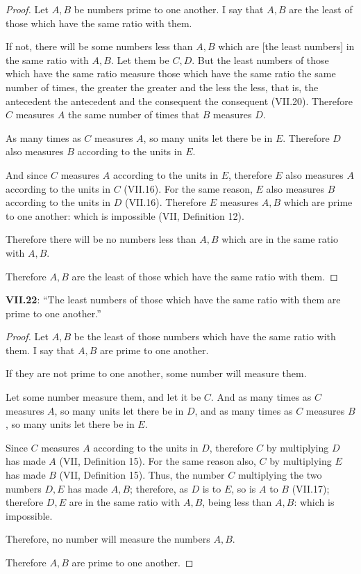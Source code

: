 \documentclass{article}
\begin{document}
\begin{proof}
Let $A,B$ be numbers prime to one another. I say that $A,B$ are the least of those which have the same
ratio with them.

If not, there will be some numbers less than $A,B$ which are [the least numbers] in the same ratio with $A,B$. Let them be $C,D$.
But
the least numbers of those which have the same ratio measure those which have the same ratio the same number of times, the greater the greater and the less the less,
that is, the antecedent the antecedent and the consequent the consequent (VII.20).
Therefore $C$ measures $A$ the same number of times that $B$ measures $D$.

As many times as $C$ measures $A$, so many units let there be in $E$. 
Therefore $D$ also measures $B$ according to the units in $E$.

And since $C$ measures $A$ according to the units in $E$, 
therefore $E$ also measures $A$ according to the units in $C$ (VII.16).
For the same reason, $E$ also measures $B$ according to the units in $D$ (VII.16).
Therefore $E$ measures $A,B$ which are prime to one another: which is impossible (VII, Definition 12). 

Therefore there will be no numbers less than $A,B$ which are in the same ratio with $A,B$. 

Therefore $A,B$ are the least of those which have the same ratio with them.
\end{proof}



\textbf{VII.22}: ``The least numbers of those which have the same ratio with
them are prime to one another.''

\begin{proof}
Let $A,B$ be the least of those numbers which have the same ratio with them. I say that $A,B$ are prime to one another.

If they are not prime to one another, some number will measure them.

Let some number measure them, and let it be $C$.
And as many times as $C$ measures $A$, so many units let there be in $D$, and as many times as $C$ measures $B$, so many units
let there be in $E$.

Since $C$ measures $A$ according to the units in $D$, therefore $C$ by multiplying $D$ has made $A$ (VII, Definition 15).
For the same reason also, $C$ by multiplying $E$ has made $B$ (VII, Definition 15).
Thus, the number $C$ multiplying the two numbers $D,E$ has made $A,B$; therefore,
as $D$ is to $E$, so is $A$ to $B$ (VII.17); therefore
$D,E$ are in the same ratio with $A,B$, being less than $A,B$: which is impossible.

Therefore, no number will measure the numbers $A,B$.

Therefore $A,B$ are prime to one another.
\end{proof}
\end{document}
